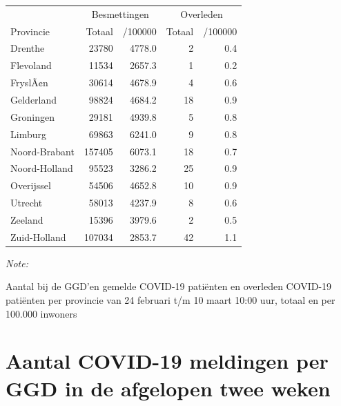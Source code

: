 \documentclass[
  english,
  man,floatsintext]{apa6}
\begin{document}
\begin{table}
\centering
\begin{threeparttable}
\begin{tabular}{lrrrr}
\toprule
\multicolumn{1}{c}{ } & \multicolumn{2}{c}{Besmettingen} & \multicolumn{2}{c}{Overleden} \\
\cmidrule(l{3pt}r{3pt}){2-3} \cmidrule(l{3pt}r{3pt}){4-5}
Provincie & Totaal & /100000 & Totaal & /100000\\
\midrule
Drenthe & 23780 & 4778.0 & 2 & 0.4\\
Flevoland & 11534 & 2657.3 & 1 & 0.2\\
FryslÃ¢n & 30614 & 4678.9 & 4 & 0.6\\
Gelderland & 98824 & 4684.2 & 18 & 0.9\\
Groningen & 29181 & 4939.8 & 5 & 0.8\\
Limburg & 69863 & 6241.0 & 9 & 0.8\\
Noord-Brabant & 157405 & 6073.1 & 18 & 0.7\\
Noord-Holland & 95523 & 3286.2 & 25 & 0.9\\
Overijssel & 54506 & 4652.8 & 10 & 0.9\\
Utrecht & 58013 & 4237.9 & 8 & 0.6\\
Zeeland & 15396 & 3979.6 & 2 & 0.5\\
Zuid-Holland & 107034 & 2853.7 & 42 & 1.1\\
\bottomrule
\end{tabular}
\begin{tablenotes}
\item \textit{Note: } 
\item Aantal bij de GGD’en gemelde COVID-19 patiënten en overleden COVID-19 patiënten per provincie van 24 februari t/m 10 maart 10:00 uur, totaal en per 100.000 inwoners
\end{tablenotes}
\end{threeparttable}
\end{table}

\newpage

\hypertarget{aantal-covid-19-meldingen-per-ggd-in-de-afgelopen-twee-weken}{%
\section{Aantal COVID-19 meldingen per GGD in de afgelopen twee weken}\label{aantal-covid-19-meldingen-per-ggd-in-de-afgelopen-twee-weken}}
\end{document}
